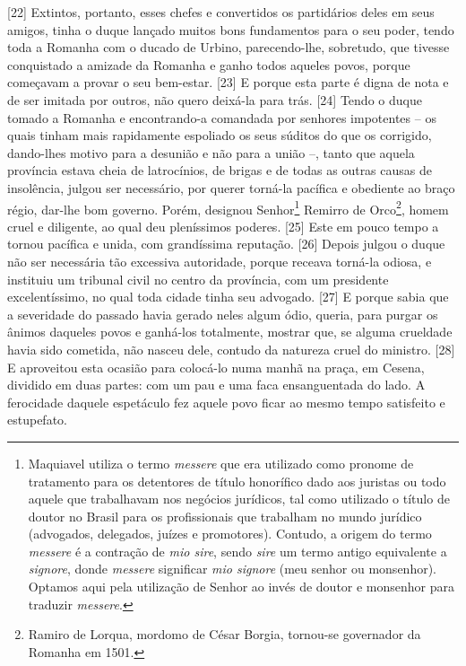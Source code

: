 {[}22{]} Extintos, portanto, esses chefes e convertidos os partidários
deles em seus amigos, tinha o duque lançado muitos bons fundamentos para
o seu poder, tendo toda a Romanha com o ducado de Urbino, parecendo-lhe,
sobretudo, que tivesse conquistado a amizade da Romanha e ganho todos
aqueles povos, porque começavam a provar o seu bem-estar. {[}23{]} E
porque esta parte é digna de nota e de ser imitada por outros, não quero
deixá-la para trás. {[}24{]} Tendo o duque tomado a Romanha e
encontrando-a comandada por senhores impotentes -- os quais tinham mais
rapidamente espoliado os seus súditos do que os corrigido, dando-lhes
motivo para a desunião e não para a união --, tanto que aquela província
estava cheia de latrocínios, de brigas e de todas as outras causas de
insolência, julgou ser necessário, por querer torná-la pacífica e
obediente ao braço régio, dar-lhe bom governo. Porém, designou
Senhor\footnote{Maquiavel utiliza o termo \emph{messere} que era
  utilizado como pronome de tratamento para os detentores de título
  honorífico dado aos juristas ou todo aquele que trabalhavam nos
  negócios jurídicos, tal como utilizado o título de doutor no Brasil
  para os profissionais que trabalham no mundo jurídico (advogados,
  delegados, juízes e promotores). Contudo, a origem do termo
  \emph{messere} é a contração de \emph{mio sire}, sendo \emph{sire} um
  termo antigo equivalente a \emph{signore}, donde \emph{messere}
  significar \emph{mio signore} (meu senhor ou monsenhor). Optamos aqui
  pela utilização de Senhor ao invés de doutor e monsenhor para traduzir
  \emph{messere}.} Remirro de Orco\footnote{Ramiro de Lorqua, mordomo de
  César Borgia, tornou-se governador da Romanha em 1501.}, homem cruel e
diligente, ao qual deu pleníssimos poderes. {[}25{]} Este em pouco tempo
a tornou pacífica e unida, com grandíssima reputação. {[}26{]} Depois
julgou o duque não ser necessária tão excessiva autoridade, porque
receava torná-la odiosa, e instituiu um tribunal civil no centro da
província, com um presidente excelentíssimo, no qual toda cidade tinha
seu advogado. {[}27{]} E porque sabia que a severidade do passado havia
gerado neles algum ódio, queria, para purgar os ânimos daqueles povos e
ganhá-los totalmente, mostrar que, se alguma crueldade havia sido
cometida, não nasceu dele, contudo da natureza cruel do ministro.
{[}28{]} E aproveitou esta ocasião para colocá-lo numa manhã na praça,
em Cesena, dividido em duas partes: com um pau e uma faca ensanguentada
do lado. A ferocidade daquele espetáculo fez aquele povo ficar ao mesmo
tempo satisfeito e estupefato.

